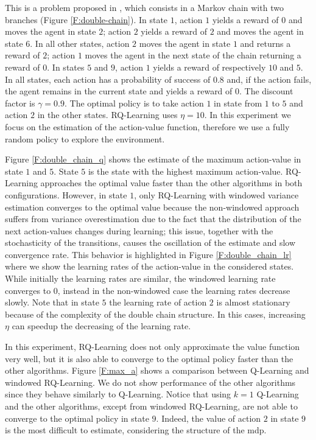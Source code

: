 This is a problem proposed in \cite{Peters2010RelativeEP}, which consists in a Markov chain with two branches (Figure \ref{F:double-chain}). In state $1$, action $1$ yields a reward of $0$ and moves the agent in state $2$; action $2$ yields a reward of $2$ and moves the agent in state $6$. In all other states, action $2$ moves the agent in state $1$ and returns a reward of $2$; action $1$ moves the agent in the next state of the chain returning a reward of $0$. In states $5$ and $9$, action $1$ yields a reward of respectively $10$ and $5$. In all states, each action has a probability of success of $0.8$ and, if the action fails, the agent remains in the current state and yields a reward of $0$. The discount factor is $\gamma = 0.9$. The optimal policy is to take action $1$ in state from $1$ to $5$ and action $2$ in the other states. RQ-Learning uses $\eta = 10$. In this experiment we focus on the estimation of the action-value function, therefore we use a fully random policy to explore the environment.

Figure \ref{F:double_chain_q} shows the estimate of the maximum action-value in state $1$ and $5$. State $5$ is the state with the highest maximum action-value. RQ-Learning approaches the optimal value faster than the other algorithms in both configurations. However, in state $1$, only RQ-Learning with windowed variance estimation converges to the optimal value because the non-windowed approach suffers from variance overestimation due to the fact that the distribution of the next action-values changes during learning; this issue, together with the stochasticity of the transitions, causes the oscillation of the estimate and slow convergence rate. This behavior is highlighted in Figure \ref{F:double_chain_lr} where we show the learning rates of the action-value in the considered states. While initially the learning rates are similar, the windowed learning rate converges to $0$, instead in the non-windowed case the learning rates decrease slowly. Note that in state $5$ the learning rate of action $2$ is almost stationary because of the complexity of the double chain structure. In this cases, increasing $\eta$ can speedup the decreasing of the learning rate.

In this experiment, RQ-Learning does not only approximate the value function very well, but it is also able to converge to the optimal policy faster than the other algorithms. Figure \ref{F:max_a} shows a comparison between Q-Learning and windowed RQ-Learning. We do not show performance of the other algorithms since they behave similarly to Q-Learning. Notice that using $k = 1$ Q-Learning and the other algorithms, except from windowed RQ-Learning, are not able to converge to the optimal policy in state $9$. Indeed, the value of action $2$ in state $9$ is the most difficult to estimate, considering the structure of the \gls{mdp}.

